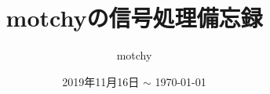 \documentclass[dvipdfmx,uplatex,report]{jsbook}%
\theoremstyle{definition}%
\begin{document}
	\title{motchyの信号処理備忘録}
	\author{motchy}
	\date{ 2019年11月16日 $\sim$ \today}
	\maketitle
	{\scriptsize \tableofcontents}

	\newcommand{\cycConv}[2]{\underset{\text{cyc}}{{#1}*{#2}}}

	
	
	
	
	
	

	\begin{thebibliography}{99}
	\end{thebibliography}
\end{document}

